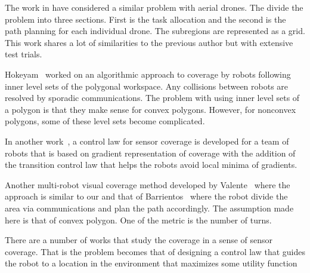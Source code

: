 \documentclass[../main.tex]{subfiles}
\begin{document}
The work in \cite{barrientos2011aerial} have considered a similar problem with aerial drones. The divide the problem into three sections. First is the task allocation and the second is the path planning for each individual drone. The subregions are represented as a grid. This work shares a lot of similarities to the previous author but with extensive test trials.

Hokeyam~\cite{hokayem2007dynamic} worked on an algorithmic approach to coverage by robots following inner level sets of the polygonal workspace. Any collisions between robots are resolved by sporadic communications. The problem with using inner level sets of a polygon is that they make sense for convex polygons. However, for nonconvex polygons, some of these level sets become complicated. 

In another work~\cite{atincc2013supervised}, a control law for sensor coverage is developed for a team of robots that is based on gradient representation of coverage with the addition of the transition control law that helps the robots avoid local minima of gradients.

Another multi-robot visual coverage method developed by Valente~\cite{valente2011multi} where the approach is similar to our and that of Barrientos~\cite{barrientos2011aerial} where the robot divide the area via communications and plan the path accordingly. The assumption made here is that of convex polygon. One of the metric is the number of turns.

There are a number of works that study the coverage in a sense of sensor coverage. That is the problem becomes that of designing a control law that guides the robot to a location in the environment that maximizes some utility function%
\end{document}
